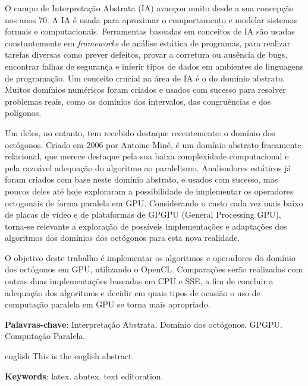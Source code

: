 

\setlength{\absparsep}{18pt} %
\begin{resumo}

O campo de Interpretação Abstrata (IA) avançou muito desde a sua concepção nos 
anos 70. A IA é usada para aproximar o comportamento e modelar sistemas formais 
e computacionais. Ferramentas baseadas em conceitos de IA são usadas 
constantemente em \emph{frameworks} de análise estática de programas, para 
realizar tarefas diversas como prever defeitos, provar a corretura ou ausência 
de bugs, encontrar falhas de segurança e inferir tipos de dados em ambientes de 
linguagens de programação. Um conceito crucial na área de IA é o do domínio 
abstrato. Muitos domínios numéricos foram criados e usados com sucesso para 
resolver problemas reais, como os domínios dos intervalos, das congruências e 
dos polígonos.

Um deles, no entanto, tem recebido destaque recentemente: o domínio dos 
octógonos. Criado em 2006 por Antoine Miné, é um domínio abstrato fracamente 
relacional, que merece destaque pela sua baixa complexidade computacional e 
pela razoável adequação do algoritmo ao paralelismo. Analisadores estáticos já 
foram criados com base neste domínio abstrato, e usados com sucesso, mas poucos 
deles até hoje exploraram a possibilidade de implementar os operadores 
octogonais de forma paralela em GPU. Considerando o custo cada vez mais baixo 
de placas de vídeo e de plataformas de GPGPU (General Processing GPU), torna-se 
relevante a exploração de possíveis implementações e adaptações dos algoritmos 
dos domínios dos octógonos para esta nova realidade.

O objetivo deste trabalho é implementar os algoritmos e operadores do domínio 
dos octógonos em GPU, utilizando o OpenCL. Comparações serão realizadas com 
outras duas implementações baseadas em CPU e SSE, a fim de concluir a adequação 
dos algoritmos e decidir em quais tipos de ocasião o uso de computação paralela 
em GPU se torna mais apropriado.

\vspace{\onelineskip}

\textbf{Palavras-chave}: Interpretação Abstrata. Domínio dos octógonos. GPGPU. Computação Paralela.
\end{resumo}

\begin{resumo}[Abstract]
 \begin{otherlanguage*}{english}
   This is the english abstract.

   \vspace{\onelineskip}
 
   \noindent 
   \textbf{Keywords}: latex. abntex. text editoration.
 \end{otherlanguage*}
\end{resumo}


